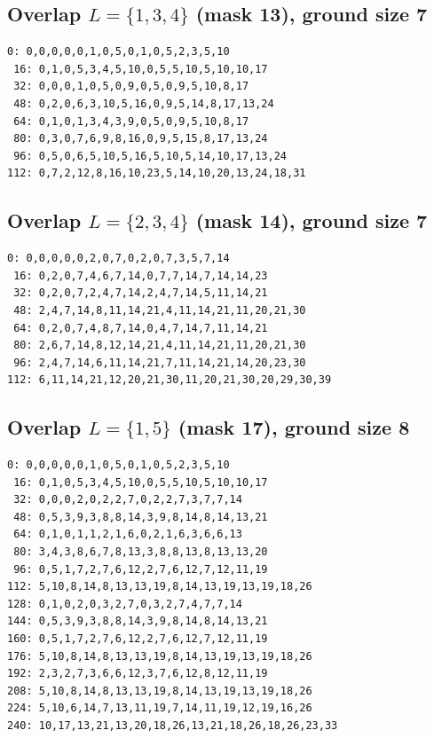 \documentclass[11pt]{article}
\begin{document}
\subsection*{Overlap $L=\{1,3,4\}$ (mask 13), ground size 7}
\begin{Verbatim}[fontsize=\footnotesize]
  0: 0,0,0,0,0,1,0,5,0,1,0,5,2,3,5,10
 16: 0,1,0,5,3,4,5,10,0,5,5,10,5,10,10,17
 32: 0,0,0,1,0,5,0,9,0,5,0,9,5,10,8,17
 48: 0,2,0,6,3,10,5,16,0,9,5,14,8,17,13,24
 64: 0,1,0,1,3,4,3,9,0,5,0,9,5,10,8,17
 80: 0,3,0,7,6,9,8,16,0,9,5,15,8,17,13,24
 96: 0,5,0,6,5,10,5,16,5,10,5,14,10,17,13,24
112: 0,7,2,12,8,16,10,23,5,14,10,20,13,24,18,31
\end{Verbatim}
\subsection*{Overlap $L=\{2,3,4\}$ (mask 14), ground size 7}
\begin{Verbatim}[fontsize=\footnotesize]
  0: 0,0,0,0,0,2,0,7,0,2,0,7,3,5,7,14
 16: 0,2,0,7,4,6,7,14,0,7,7,14,7,14,14,23
 32: 0,2,0,7,2,4,7,14,2,4,7,14,5,11,14,21
 48: 2,4,7,14,8,11,14,21,4,11,14,21,11,20,21,30
 64: 0,2,0,7,4,8,7,14,0,4,7,14,7,11,14,21
 80: 2,6,7,14,8,12,14,21,4,11,14,21,11,20,21,30
 96: 2,4,7,14,6,11,14,21,7,11,14,21,14,20,23,30
112: 6,11,14,21,12,20,21,30,11,20,21,30,20,29,30,39
\end{Verbatim}
\subsection*{Overlap $L=\{1,5\}$ (mask 17), ground size 8}
\begin{Verbatim}[fontsize=\footnotesize]
  0: 0,0,0,0,0,1,0,5,0,1,0,5,2,3,5,10
 16: 0,1,0,5,3,4,5,10,0,5,5,10,5,10,10,17
 32: 0,0,0,2,0,2,2,7,0,2,2,7,3,7,7,14
 48: 0,5,3,9,3,8,8,14,3,9,8,14,8,14,13,21
 64: 0,1,0,1,1,2,1,6,0,2,1,6,3,6,6,13
 80: 3,4,3,8,6,7,8,13,3,8,8,13,8,13,13,20
 96: 0,5,1,7,2,7,6,12,2,7,6,12,7,12,11,19
112: 5,10,8,14,8,13,13,19,8,14,13,19,13,19,18,26
128: 0,1,0,2,0,3,2,7,0,3,2,7,4,7,7,14
144: 0,5,3,9,3,8,8,14,3,9,8,14,8,14,13,21
160: 0,5,1,7,2,7,6,12,2,7,6,12,7,12,11,19
176: 5,10,8,14,8,13,13,19,8,14,13,19,13,19,18,26
192: 2,3,2,7,3,6,6,12,3,7,6,12,8,12,11,19
208: 5,10,8,14,8,13,13,19,8,14,13,19,13,19,18,26
224: 5,10,6,14,7,13,11,19,7,14,11,19,12,19,16,26
240: 10,17,13,21,13,20,18,26,13,21,18,26,18,26,23,33
\end{Verbatim}
\end{document}
